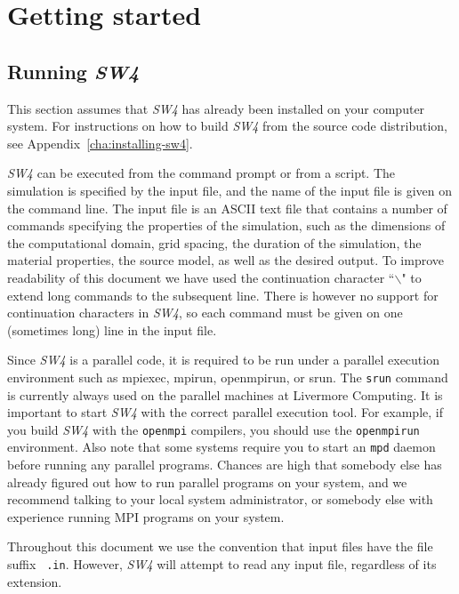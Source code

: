 \documentclass[11pt]{report}
\begin{document}
\chapter{Getting started}

\section{Running \emph{SW4}}
This section assumes that \emph{SW4} has already been installed on your computer system. For
instructions on how to build \emph{SW4} from the source code distribution, see
Appendix~\ref{cha:installing-sw4}.

\emph{SW4} can be executed from the command prompt or from a script. The simulation is specified by
the input file, and the name of the input file is given on the command line. The input file is an
ASCII text file that contains a number of commands specifying the properties of the simulation, such
as the dimensions of the computational domain, grid spacing, the duration of the simulation, the
material properties, the source model, as well as the desired output. To improve readability of this
document we have used the continuation character ``$\backslash$" to extend long commands to the
subsequent line. There is however no support for continuation characters in \emph{SW4}, so each
command must be given on one (sometimes long) line in the input file.

Since \emph{SW4} is a parallel code, it is required to be run under a parallel execution environment
such as mpiexec, mpirun, openmpirun, or srun. The \verb+srun+ command is currently always used on
the parallel machines at Livermore Computing. It is important to start \emph{SW4} with the correct
parallel execution tool. For example, if you build \emph{SW4} with the \verb+openmpi+ compilers, you
should use the \verb+openmpirun+ environment. Also note that some systems require you to start an
\verb+mpd+ daemon before running any parallel programs. Chances are high that somebody else has
already figured out how to run parallel programs on your system, and we recommend talking to your
local system administrator, or somebody else with experience running MPI programs on your system.

Throughout this document we use the convention that input files have the file suffix {\tt
  .in}. However, \emph{SW4} will attempt to read any input file, regardless of its extension.
\end{document}

